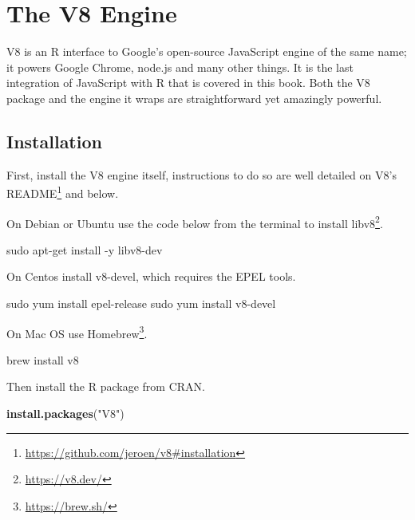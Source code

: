 \documentclass[10pt,]{krantz}
\makeatletter
\newenvironment{Shaded}{\begin{snugshade}}{\end{snugshade}}
\newcommand{\ExtensionTok}[1]{#1}
\newcommand{\FunctionTok}[1]{\textcolor[rgb]{0,0,0}{#1}}
\newcommand{\KeywordTok}[1]{\textcolor[rgb]{0.27,0.27,0.27}{\textbf{#1}}}
\newcommand{\NormalTok}[1]{#1}
\newcommand{\StringTok}[1]{\textcolor[rgb]{0.5,0.5,0.5}{#1}}
\renewcommand{\href}[2]{#2\footnote{\url{#1}}}
\newenvironment{kframe}{%
\medskip{}
\setlength{\fboxsep}{.8em}
 \def\at@end@of@kframe{}%
 \ifinner\ifhmode%
  \def\at@end@of@kframe{\end{minipage}}%
  \begin{minipage}{\columnwidth}%
 \fi\fi%
 \def\FrameCommand##1{\hskip\@totalleftmargin \hskip-\fboxsep
 \colorbox{shadecolor}{##1}\hskip-\fboxsep
     \hskip-\linewidth \hskip-\@totalleftmargin \hskip\columnwidth}%
 \MakeFramed {\advance\hsize-\width
   \@totalleftmargin\z@ \linewidth\hsize
   \@setminipage}}%
 {\par\unskip\endMakeFramed%
 \at@end@of@kframe}
\renewenvironment{Shaded}{\begin{kframe}}{\end{kframe}}
\makeatother
\begin{document}
\hypertarget{v8}{%
\chapter{The V8 Engine}\label{v8}}

V8 is an R interface to Google's open-source JavaScript engine of the same name; it powers Google Chrome, node.js and many other things. It is the last integration of JavaScript with R that is covered in this book. Both the V8 package and the engine it wraps are straightforward yet amazingly powerful.

\hypertarget{v8-installation}{%
\section{Installation}\label{v8-installation}}

First, install the V8 engine itself, instructions to do so are well detailed on \href{https://github.com/jeroen/v8\#installation}{V8's README} and below.

On Debian or Ubuntu use the code below from the terminal to install \href{https://v8.dev/}{libv8}.

\begin{Shaded}
\begin{Highlighting}[]
\FunctionTok{sudo}\NormalTok{ apt-get install -y libv8-dev}
\end{Highlighting}
\end{Shaded}

On Centos install v8-devel, which requires the EPEL tools.

\begin{Shaded}
\begin{Highlighting}[]
\FunctionTok{sudo}\NormalTok{ yum install epel-release}
\FunctionTok{sudo}\NormalTok{ yum install v8-devel}
\end{Highlighting}
\end{Shaded}

On Mac OS use \href{https://brew.sh/}{Homebrew}.

\begin{Shaded}
\begin{Highlighting}[]
\ExtensionTok{brew}\NormalTok{ install v8}
\end{Highlighting}
\end{Shaded}

Then install the R package from CRAN.

\begin{Shaded}
\begin{Highlighting}[]
\KeywordTok{install.packages}\NormalTok{(}\StringTok{"V8"}\NormalTok{)}
\end{Highlighting}
\end{Shaded}
\end{document}
